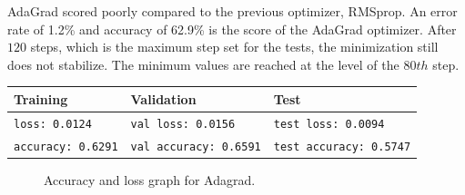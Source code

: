 \documentclass[lnbip]{svmultln}
\newcommand{\myfloatalign}{\centering}
\begin{document}
	AdaGrad scored poorly compared to the previous optimizer, RMSprop. An error rate of 1.2\% and accuracy of 62.9\% is the score of the AdaGrad optimizer. After $120$ steps, which is the maximum step set for the tests, the minimization still does not stabilize. The minimum values are reached at the level of the $80th$ step.
	\begin{table}[H]
		\centering
		\begin{tabular}{l|l|l}
			\hline
			\textbf{Training} & \textbf{Validation} & \textbf{Test} \\
			\hline
			
			\texttt{loss: 0.0124} & \texttt{val loss: 0.0156} & \texttt{test loss: 0.0094} \\
			\texttt{accuracy: 0.6291} & \texttt{val accuracy: 0.6591} & \texttt{test accuracy: 0.5747} \\
			
			\hline
			
		\end{tabular}
	\end{table}
	\begin{figure}[H]
		\myfloatalign
		 \quad
		
		\caption[]{Accuracy and loss graph for Adagrad.}
	\end{figure}
	
	
\end{document}
